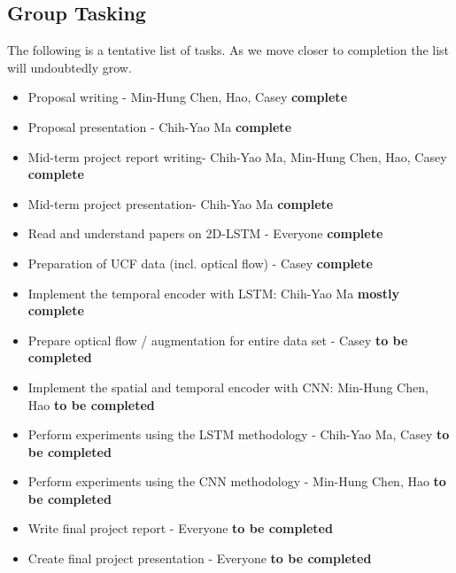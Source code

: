 \subsection*{Group Tasking}
The following is a tentative list of tasks. As we move closer to completion the list will undoubtedly grow. 
\begin{itemize}
\item Proposal writing - Min-Hung Chen, Hao, Casey \qquad \textbf{complete}
\item Proposal presentation - Chih-Yao Ma \qquad \textbf{complete}
\item Mid-term project report writing- Chih-Yao Ma, Min-Hung Chen, Hao, Casey \qquad \textbf{complete}
\item Mid-term project presentation- Chih-Yao Ma \qquad \textbf{complete}
\item Read and understand papers on 2D-LSTM - Everyone \qquad \textbf{complete}
\item Preparation of UCF data (incl. optical flow) - Casey \qquad \textbf{complete}
\item Implement the temporal encoder with LSTM: Chih-Yao Ma \qquad \textbf{mostly complete}
\item Prepare optical flow / augmentation for entire data set - Casey  \textbf{to be completed}
\item Implement the spatial and temporal encoder with CNN: Min-Hung Chen, Hao \textbf{to be completed}
\item Perform experiments using the LSTM methodology - Chih-Yao Ma, Casey \textbf{to be completed}
\item Perform experiments using the CNN methodology - Min-Hung Chen, Hao \textbf{to be completed}
	
\item Write final project report - Everyone \textbf{to be completed}
\item Create final project presentation - Everyone \textbf{to be completed}
\end{itemize}

